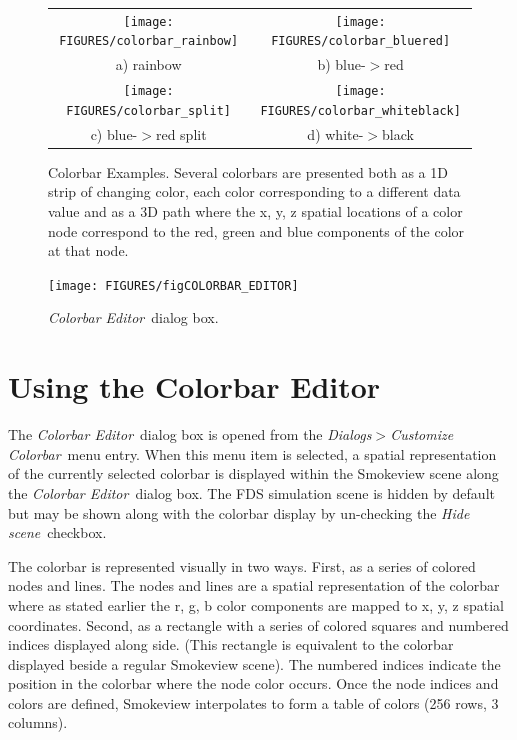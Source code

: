 \documentclass[11pt,twoside]{book}
\begin{document}
\begin{figure}[\figoptions]
\begin{center}
\begin{tabular}{cc}
\texttt{[image: FIGURES/colorbar\_rainbow]}&
\texttt{[image: FIGURES/colorbar\_bluered]}\\
a) rainbow&b) blue-$>$red\\
\texttt{[image: FIGURES/colorbar\_split]}&
\texttt{[image: FIGURES/colorbar\_whiteblack]}\\
c) blue-$>$red split&d) white-$>$black
\end{tabular}
\end{center}
\caption[Colorbar Examples]{
Colorbar Examples.  Several colorbars are presented both as a 1D strip
of changing color, each color corresponding to a different data value and as a 3D path where the x, y, z spatial locations
of a color node correspond to the red, green and blue components of the color at that node.} \label{figCOLORBAR_EXAMPLES}
\end{figure}

\begin{figure}[\figoptions]
\begin{center}
\texttt{[image: FIGURES/figCOLORBAR\_EDITOR]}
\end{center}
\caption[{\em Colorbar Editor}\ dialog box.]{ {\em Colorbar
Editor}\ dialog box.} \label{figCOLORBAR}
\end{figure}

\section{Using the Colorbar Editor}
\label{section:colorbar}
The {\em Colorbar Editor}\ dialog box is opened from the {\em
Dialogs$>$Customize Colorbar}\ menu entry. When this menu item is
selected, a spatial representation of the currently selected
colorbar is displayed within the Smokeview scene along the {\em
Colorbar Editor}\ dialog box.  The FDS simulation scene is hidden
by default but may be shown along with the colorbar display by
un-checking the {\em Hide scene}\ checkbox.

The colorbar is represented visually in two ways.  First, as a series
of colored nodes and lines.
The nodes and lines are a spatial representation of the colorbar where as
stated earlier the r, g, b color components are mapped to x, y, z spatial
coordinates.
Second, as a rectangle with a series of colored squares and numbered
indices
displayed along side. (This rectangle is equivalent to the colorbar
displayed beside a regular Smokeview scene).  The numbered indices indicate
the position in the colorbar where the node color occurs.
Once the node indices and colors are defined, Smokeview interpolates to
form a table of colors (256 rows, 3 columns).
\end{document}
